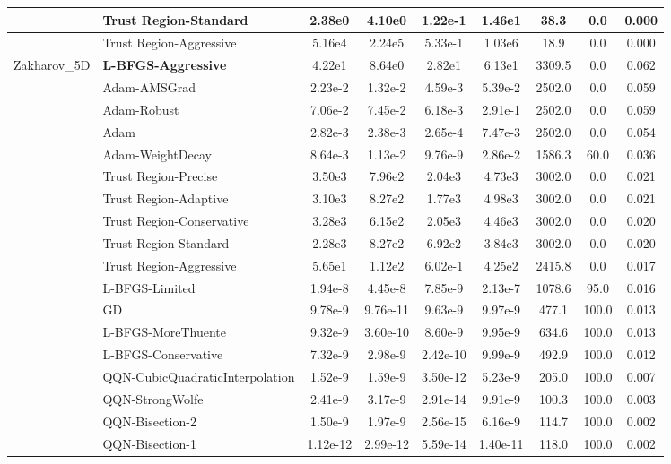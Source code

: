 \documentclass{article}
\begin{document}
\begin{longtable}{|l|l|c|c|c|c|c|c|c|}
\hline
 & Trust Region-Standard & 2.38e0 & 4.10e0 & 1.22e-1 & 1.46e1 & 38.3 & 0.0 & 0.000 \\
\hline
 & Trust Region-Aggressive & 5.16e4 & 2.24e5 & 5.33e-1 & 1.03e6 & 18.9 & 0.0 & 0.000 \\
Zakharov\_5D & \textbf{L-BFGS-Aggressive} & 4.22e1 & 8.64e0 & 2.82e1 & 6.13e1 & 3309.5 & 0.0 & 0.062 \\
\hline
 & Adam-AMSGrad & 2.23e-2 & 1.32e-2 & 4.59e-3 & 5.39e-2 & 2502.0 & 0.0 & 0.059 \\
\hline
 & Adam-Robust & 7.06e-2 & 7.45e-2 & 6.18e-3 & 2.91e-1 & 2502.0 & 0.0 & 0.059 \\
\hline
 & Adam & 2.82e-3 & 2.38e-3 & 2.65e-4 & 7.47e-3 & 2502.0 & 0.0 & 0.054 \\
\hline
 & Adam-WeightDecay & 8.64e-3 & 1.13e-2 & 9.76e-9 & 2.86e-2 & 1586.3 & 60.0 & 0.036 \\
\hline
 & Trust Region-Precise & 3.50e3 & 7.96e2 & 2.04e3 & 4.73e3 & 3002.0 & 0.0 & 0.021 \\
\hline
 & Trust Region-Adaptive & 3.10e3 & 8.27e2 & 1.77e3 & 4.98e3 & 3002.0 & 0.0 & 0.021 \\
\hline
 & Trust Region-Conservative & 3.28e3 & 6.15e2 & 2.05e3 & 4.46e3 & 3002.0 & 0.0 & 0.020 \\
\hline
 & Trust Region-Standard & 2.28e3 & 8.27e2 & 6.92e2 & 3.84e3 & 3002.0 & 0.0 & 0.020 \\
\hline
 & Trust Region-Aggressive & 5.65e1 & 1.12e2 & 6.02e-1 & 4.25e2 & 2415.8 & 0.0 & 0.017 \\
\hline
 & L-BFGS-Limited & 1.94e-8 & 4.45e-8 & 7.85e-9 & 2.13e-7 & 1078.6 & 95.0 & 0.016 \\
\hline
 & GD & 9.78e-9 & 9.76e-11 & 9.63e-9 & 9.97e-9 & 477.1 & 100.0 & 0.013 \\
\hline
 & L-BFGS-MoreThuente & 9.32e-9 & 3.60e-10 & 8.60e-9 & 9.95e-9 & 634.6 & 100.0 & 0.013 \\
\hline
 & L-BFGS-Conservative & 7.32e-9 & 2.98e-9 & 2.42e-10 & 9.99e-9 & 492.9 & 100.0 & 0.012 \\
\hline
 & QQN-CubicQuadraticInterpolation & 1.52e-9 & 1.59e-9 & 3.50e-12 & 5.23e-9 & 205.0 & 100.0 & 0.007 \\
\hline
 & QQN-StrongWolfe & 2.41e-9 & 3.17e-9 & 2.91e-14 & 9.91e-9 & 100.3 & 100.0 & 0.003 \\
\hline
 & QQN-Bisection-2 & 1.50e-9 & 1.97e-9 & 2.56e-15 & 6.16e-9 & 114.7 & 100.0 & 0.002 \\
\hline
 & QQN-Bisection-1 & 1.12e-12 & 2.99e-12 & 5.59e-14 & 1.40e-11 & 118.0 & 100.0 & 0.002 \\

\end{longtable}
\end{document}
